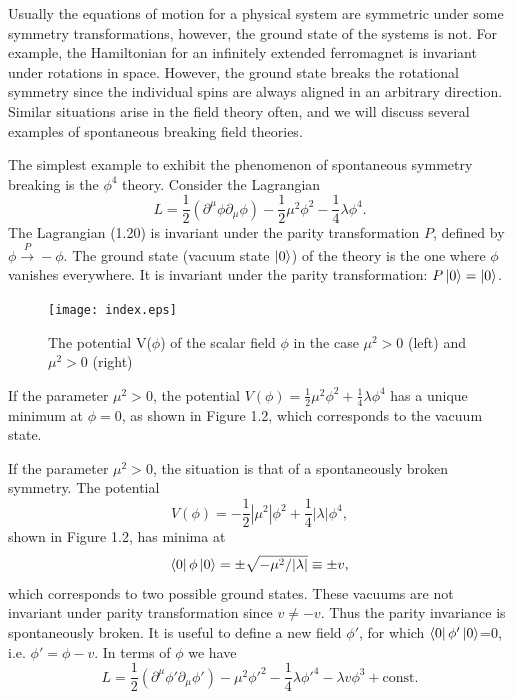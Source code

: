Usually the equations of motion for a physical system are symmetric under some symmetry transformations, however, the ground state of the systems is not. For example, the Hamiltonian for an infinitely extended ferromagnet is invariant under rotations in space. However, the ground state breaks the rotational symmetry since the individual spins are always aligned in an arbitrary direction. Similar situations arise in the field theory often, and we will discuss several examples of spontaneous breaking field theories.

The simplest example to exhibit the phenomenon of spontaneous symmetry breaking is the $\phi^4$ theory. Consider the Lagrangian
\begin{equation}
L=\frac{1}{2}(\partial^\mu \phi\partial_\mu \phi)-\frac{1}{2}\mu^2\phi^2-\frac{1}{4}\lambda\phi^4.
\end{equation}
The Lagrangian (1.20) is invariant under the parity transformation $P$, defined by $\phi\stackrel{P}{\to} -\phi$. The ground state (vacuum state $\Ket{0}$) of the theory is the one where $\phi$ vanishes everywhere. It is invariant under the parity transformation: $P\Ket{0}=\Ket{0}$. 

\begin{figure}
	\begin{center}
		\texttt{[image: index.eps]}\\
		\caption{The potential V($\phi$) of the scalar field $\phi$ in the case $\mu^2>0$ (left) and $\mu^2>0$ (right)  }
	\end{center}
\end{figure}

If the parameter $\mu^2>0$, the potential $V(\phi)=\frac{1}{2}\mu^2\phi^2+\frac{1}{4}\lambda\phi^4$ has a unique minimum at $\phi=0$, as shown in Figure 1.2, which corresponds to the vacuum state. 

If the parameter $\mu^2>0$, the situation is that of a spontaneously broken symmetry. The potential 
\begin{equation}
V(\phi)=-\frac{1}{2}|\mu^2|\phi^2+\frac{1}{4}|\lambda|\phi^4,
\end{equation}
shown in Figure 1.2, has minima at 
\begin{equation}
\Bra{0}\phi\Ket{0} = \pm\sqrt{-\mu^2/|\lambda|}\equiv \pm v,
\end{equation}
which corresponds to two possible ground states. These vacuums are not invariant under parity transformation since $v \neq -v$. Thus the parity invariance is spontaneously broken. It is useful to define a new field $\phi'$, for which $\Bra{0}\phi'\Ket{0}$=0, i.e. $\phi'=\phi-v$. In terms of $\phi$ we have 
\begin{equation}
L=\frac{1}{2}(\partial^\mu \phi'\partial_\mu \phi')-\mu^2\phi'^2-\frac{1}{4}\lambda\phi'^4-\lambda v\phi^3+\text{const}.
\end{equation}

